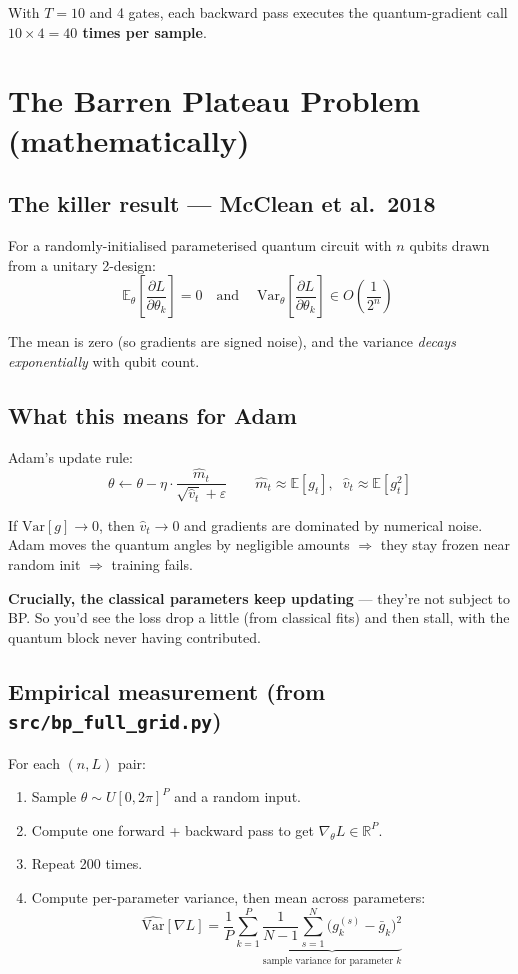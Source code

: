 \documentclass[11pt,a4paper]{article}
\begin{document}
With $T = 10$ and 4 gates, each backward pass executes the quantum-gradient call \textbf{$10 \times 4 = 40$ times per sample}.

\section{The Barren Plateau Problem (mathematically)}

\subsection{The killer result --- McClean et al.\ 2018}

For a randomly-initialised parameterised quantum circuit with $n$ qubits drawn from a unitary 2-design:
\[
  \mathbb{E}_{\theta}\!\left[\frac{\partial L}{\partial \theta_k}\right] = 0
  \quad\text{and}\quad
  \boxed{\;\mathrm{Var}_{\theta}\!\left[\frac{\partial L}{\partial \theta_k}\right] \in O\!\left(\frac{1}{2^n}\right)\;}
\]

The mean is zero (so gradients are signed noise), and the variance \emph{decays exponentially} with qubit count.

\subsection{What this means for Adam}

Adam's update rule:
\[
  \theta \leftarrow \theta - \eta \cdot \frac{\hat m_t}{\sqrt{\hat v_t} + \varepsilon}
  \qquad
  \hat m_t \approx \mathbb{E}[g_t], \;\; \hat v_t \approx \mathbb{E}[g_t^2]
\]

If $\mathrm{Var}[g] \to 0$, then $\hat v_t \to 0$ and gradients are dominated by numerical noise. Adam moves the quantum angles by negligible amounts $\Rightarrow$ they stay frozen near random init $\Rightarrow$ training fails.

\textbf{Crucially, the classical parameters keep updating} --- they're not subject to BP. So you'd see the loss drop a little (from classical fits) and then stall, with the quantum block never having contributed.

\subsection{Empirical measurement (from \texttt{src/bp\_full\_grid.py})}

For each $(n, L)$ pair:
\begin{enumerate}
  \item Sample $\theta \sim U[0, 2\pi]^P$ and a random input.
  \item Compute one forward + backward pass to get $\nabla_\theta L \in \mathbb{R}^P$.
  \item Repeat 200 times.
  \item Compute per-parameter variance, then mean across parameters:
  \[
    \widehat{\mathrm{Var}}[\nabla L] = \frac{1}{P} \sum_{k=1}^{P}
      \underbrace{\frac{1}{N-1} \sum_{s=1}^{N} \bigl(g_k^{(s)} - \bar g_k\bigr)^2}_{\text{sample variance for parameter } k}
  \]
\end{enumerate}
\end{document}
